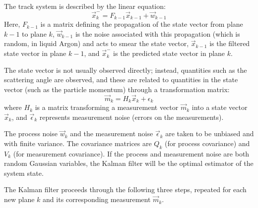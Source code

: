 The track system is described by the linear equation:\citep{Ankowski2006}
\begin{equation}\label{eqn:kalman_track_system}
    \vec{x}_k^{-} = F_{k-1} \vec{x}_{k-1} + \vec{w}_{k-1}
\end{equation}
Here, $F_{k-1}$ is a matrix defining the propagation of the state vector from plane $k-1$ to plane $k$, $\vec{w}_{k-1}$ is the noise associated with this propagation (which is random, in liquid Argon) and acts to smear the state vector, $\vec{x}_{k-1}$ is the filtered state vector in plane $k-1$, and $\vec{x}_k^{-}$ is the predicted state vector in plane $k$.

The state vector is not usually observed directly; instead, quantities such as the scattering angle are observed, and these are related to quantities in the state vector (such as the particle momentum) through a transformation matrix:
\begin{equation}\label{eqn:kalman_measurement_equation}
    \vec{m}_k = H_k \vec{x}_k + \epsilon_k
\end{equation}
where $H_k$ is a matrix transforming a measurement vector $\vec{m}_k$ into a state vector $\vec{x}_k$, and $\vec{\epsilon}_k$ represents measurement noise (errors on the measurements).

The process noise $\vec{w}_k$ and the measurement noise $\vec{\epsilon}_k$ are taken to be unbiased and with finite variance. The covariance matrices are $Q_k$ (for process covariance) and $V_k$ (for measurement covariance). If the process and measurement noise are both random Gaussian variables, the Kalman filter will be the optimal estimator of the system state.

The Kalman filter proceeds through the following three steps, repeated for each new plane $k$ and its corresponding measurement $\vec{m}_k$.

